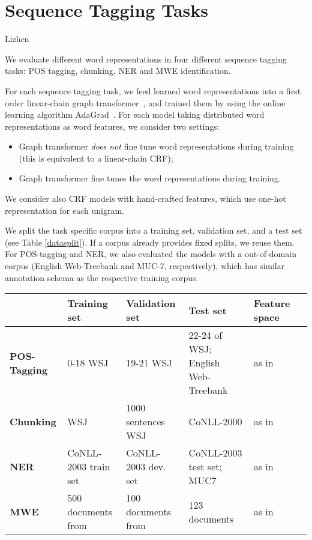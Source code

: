 \section{Sequence Tagging Tasks}
\label{sec:SeqTagging}

{\color{red}Lizhen}

We evaluate different word representations in four different sequence tagging tasks: POS tagging, chunking, NER and MWE identification. 

For each sequence tagging task, we feed learned word representations into a first order linear-chain graph
transformer~\cite{collobert2011natural}, and trained them by using the online learning algorithm
AdaGrad~\cite{duchi2011adaptive}.
For each model taking distributed word representations as word features, we consider two settings: 

\begin{small}
\begin{itemize}
\item[-] Graph transformer \textit{does not} fine tune word representations during training (this is equivalent to a linear-chain CRF);
\item[-] Graph transformer fine tunes the word representations during training.
\end{itemize}
\end{small}

We consider also CRF models with hand-crafted features, which use one-hot representation for each unigram.

We split the task specific corpus into a training set, validation set, and a test set (see Table \ref{datasplit}). If a corpus already provides fixed splits, we reuse them. For POS-tagging and NER, we also evaluated the models with a out-of-domain corpus (English Web-Treebank and MUC-7, respectively), which has similar annotation schema as the respective training corpus.

\begin{table*}
\begin{small}
\begin{tabular}{lllp{}ll}
\hline
			& \textbf{Training set} & \textbf{Validation set} & \textbf{Test set} & \textbf{Feature space} \\ \hline
\textbf{POS-Tagging} & 0-18 WSJ & 19-21 WSJ & 22-24 of WSJ; English Web-Treebank & as in~\cite{collobert2011natural} \\
\textbf{Chunking} & WSJ & 1000 sentences WSJ & CoNLL-2000 & as in~\cite{turian2010word}\\
\textbf{NER} & CoNLL-2003 train set & CoNLL-2003 dev. set & CoNLL-2003 test set; MUC7 & as in~\cite{turian2010word} \\
\textbf{MWE} & 500 documents from & 100 documents from & 123 documents & as in~\cite{mwecorpus}\\
\hline
\end{tabular}
\caption{Datasets splits and feature space for each sequence tagging task.}
\label{datasplit}
\end{small}
\end{table*}


